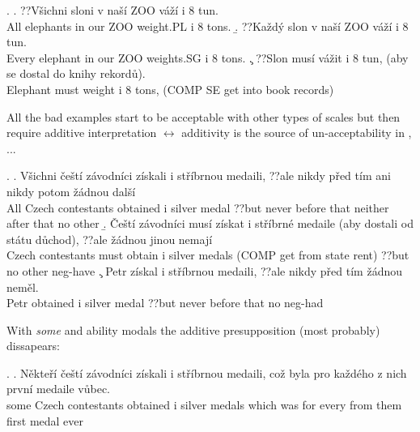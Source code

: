 \documentclass{article}
\begin{document}
\ex. \a. ??Všichni sloni v naší ZOO váží i 8 tun.\\
All elephants in our ZOO weight.PL i 8 tons.
\b. ??Každý slon v naší ZOO váží i 8 tun.\\
Every elephant in our ZOO weights.SG i 8 tons.
\c. ??Slon musí vážit i 8 tun, (aby se dostal do knihy rekordů).\\
Elephant must weight i 8 tons, (COMP SE get into book records)

All the bad examples start to be acceptable with other types of scales but then require additive interpretation $\leftrightarrow$ additivity is the source of un-acceptability in \Last, ...

\ex. \a. Všichni čeští závodníci získali i stříbrnou medaili, ??ale nikdy před tím ani nikdy potom žádnou další\\
All Czech contestants obtained i silver medal ??but never before that neither after that no other
\b. Čeští závodníci musí získat i stříbrné medaile (aby dostali od státu důchod), ??ale žádnou jinou nemají\\
Czech contestants must obtain i silver medals (COMP get from state rent) ??but no other neg-have
\c. Petr získal i stříbrnou medaili, ??ale nikdy před tím žádnou neměl.\\
Petr obtained i silver medal ??but never before that no neg-had

With \textit{some} and ability modals the additive presupposition (most probably) dissapears:

\ex. \a. Někteří čeští závodníci získali i stříbrnou medaili, což byla pro každého z nich první medaile vůbec.\\
some Czech contestants obtained i silver medals which was for every from them first medal ever
\end{document}
